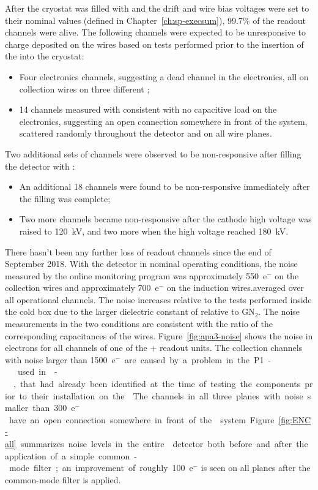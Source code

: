 After the cryostat was filled with  and the drift and wire 
bias voltages were set to their nominal values (defined in Chapter~\ref{ch:sp-execsum}), 
99.7\% of the  readout channels were alive. The following 
channels were expected to be unresponsive to charge deposited on the wires
based on tests performed prior to the insertion of the  into
the cryostat:
\begin{itemize}
\item{Four electronics channels, suggesting a dead channel in the electronics, 
all on collection wires on three different ;}
\item{14 channels measured with consistent with no capacitive load 
on the  electronics, suggesting an open connection somewhere in 
front of the  system, scattered randomly throughout the detector 
and on all wire planes.}
\end{itemize}
Two additional sets of channels were observed to be non-responsive
after filling the detector with \lar:
\begin{itemize}
\item{An additional 18 channels were found to be non-responsive
immediately after the \lar filling was complete;}
\item{Two more channels became non-responsive after the cathode
high voltage was raised to \SI{120}{kV}, and two more
when the high voltage reached \SI{180}{kV}.}
\end{itemize}
There hasn't been any further loss of readout channels since 
the end of September 2018.
With the detector in nominal operating conditions, the noise
measured by the online monitoring program was approximately 550~e$^-$ 
on the collection wires and approximately 700~e$^-$ on the induction
wires.averaged over all operational channels. The noise increases
relative to the tests performed inside the cold box due to the 
larger dielectric constant of \lntwo relative to GN$_2$. The noise
measurements in the two conditions are consistent with the 
ratio of the corresponding capacitances of the  wires.
Figure~\ref{fig:apa3-noise} 
shows the noise in electrons for all channels of one of the 
+ readout units. The collection channels with 
noise larger than \SI{1500}{e$^-$} are caused by a problem in the P1-
 used in -, that had already
been identified at the time of testing the components prior to their
installation on the . The channels in all three planes 
with noise smaller than \SI{300}{e$^-$} have an open connection somewhere in 
front of the  system. Figure~\ref{fig:ENC-all} summarizes
noise levels in the entire  detector both before and
after the application of a simple common-mode filter; an improvement
of roughly 100~e$^-$ is seen on all planes after the common-mode
filter is applied.

